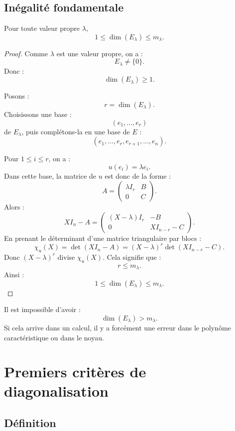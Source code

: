 \documentclass[11pt,a4paper]{article}
\begin{document}
\subsection{Inégalité fondamentale}

\begin{theorembox}
Pour toute valeur propre \(\lambda\),
\[
1\leq \dim(E_\lambda)\leq m_\lambda.
\]
\end{theorembox}

\begin{proof}
Comme \(\lambda\) est une valeur propre, on a :
\[
E_\lambda\neq\{0\}.
\]
Donc :
\[
\dim(E_\lambda)\geq1.
\]

Posons :
\[
r=\dim(E_\lambda).
\]
Choisissons une base :
\[
(e_1,\dots,e_r)
\]
de \(E_\lambda\), puis complétons-la en une base de \(E\) :
\[
(e_1,\dots,e_r,e_{r+1},\dots,e_n).
\]

Pour \(1\leq i\leq r\), on a :
\[
u(e_i)=\lambda e_i.
\]
Dans cette base, la matrice de \(u\) est donc de la forme :
\[
A=
\begin{pmatrix}
\lambda I_r & B\\
0 & C
\end{pmatrix}.
\]
Alors :
\[
XI_n-A=
\begin{pmatrix}
(X-\lambda)I_r & -B\\
0 & XI_{n-r}-C
\end{pmatrix}.
\]
En prenant le déterminant d'une matrice triangulaire par blocs :
\[
\chi_u(X)
=
\det(XI_n-A)
=
(X-\lambda)^r\det(XI_{n-r}-C).
\]
Donc \((X-\lambda)^r\) divise \(\chi_u(X)\).  
Cela signifie que :
\[
r\leq m_\lambda.
\]
Ainsi :
\[
1\leq \dim(E_\lambda)\leq m_\lambda.
\]
\end{proof}

\begin{erreurbox}
Il est impossible d'avoir :
\[
\dim(E_\lambda)>m_\lambda.
\]
Si cela arrive dans un calcul, il y a forcément une erreur dans le polynôme caractéristique ou dans le noyau.
\end{erreurbox}

\section{Premiers critères de diagonalisation}

\subsection{Définition}
\end{document}
